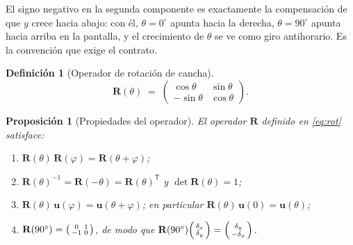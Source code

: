 \documentclass[11pt,a4paper]{article}
\newtheorem{proposicion}[teorema]{Proposición}
\theoremstyle{definition}
\newtheorem{definicion}[teorema]{Definición}
\newcommand{\Rot}{\mathbf{R}}
\newcommand{\uu}{\mathbf{u}}
\newcommand{\grados}{^{\circ}}
\begin{document}
El signo negativo en la segunda componente es exactamente la compensación de que
$y$ crece hacia abajo: con él, $\theta = 0\grados$ apunta hacia la derecha,
$\theta = 90\grados$ apunta hacia arriba en la pantalla, y el crecimiento de $\theta$
se ve como giro antihorario. Es la convención que exige el contrato.

\begin{definicion}[Operador de rotación de cancha]
\begin{equation}
  \Rot(\theta) \;=\;
  \begin{pmatrix}
    \cos\theta & \sin\theta \\[2pt]
    -\sin\theta & \cos\theta
  \end{pmatrix}.
  \label{eq:rot}
\end{equation}
\end{definicion}

\begin{proposicion}[Propiedades del operador]
\label{prop:rot}
El operador $\Rot$ definido en \eqref{eq:rot} satisface:
\begin{enumerate}[label=(\alph*),leftmargin=2.2em]
\item $\Rot(\theta)\,\Rot(\varphi) = \Rot(\theta+\varphi)$;
\item $\Rot(\theta)^{-1} = \Rot(-\theta) = \Rot(\theta)^{\mathsf{T}}$ y $\det \Rot(\theta) = 1$;
\item $\Rot(\theta)\,\uu(\varphi) = \uu(\theta+\varphi)$; en particular
      $\Rot(\theta)\,\uu(0) = \uu(\theta)$;
\item $\Rot(90\grados) = \begin{psmallmatrix} 0 & 1\\ -1 & 0\end{psmallmatrix}$, de modo que
      $\Rot(90\grados)\begin{psmallmatrix}\delta_x\\ \delta_y\end{psmallmatrix}
       = \begin{psmallmatrix}\delta_y\\ -\delta_x\end{psmallmatrix}$.
\end{enumerate}
\end{proposicion}
\end{document}
